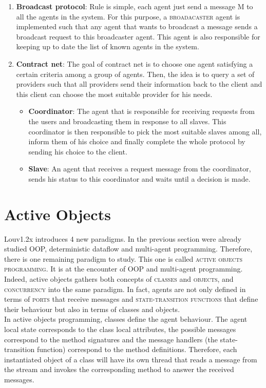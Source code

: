 \documentclass[11pt,a4paper,twoside,openright]{report}
\begin{document}
\begin{enumerate}
 \item \textbf{Broadcast protocol}: Rule is simple, each agent just send a 
message M to all the agents in the system. For this purpose, a 
\textsc{broadacaster} agent is implemented such that any agent that wants to 
broadcast a message sends a broadcast request to this broadcaster agent. This 
agent is also responsible for keeping up to date the list of known agents in 
the 
system.
 \item \textbf{Contract net}: The goal of contract net is to choose one agent 
satisfying a certain criteria among a group of agents. Then, the idea is to 
query a set of providers such that all providers send their information back to 
the client and this client can choose the most suitable provider for his needs.
  \begin{itemize}
    \item \textbf{Coordinator}: The agent that is responsible for receiving 
requests from the users and broadcasting them in response to all slaves. This 
coordinator is then responsible to pick the most suitable slaves among all, 
inform them of his choice and finally complete the whole protocol by sending 
his 
choice to the client.
    \item \textbf{Slave}: An agent that receives a request message from the 
coordinator, sends his status to this coordinator and waits until a decision is 
made.
 \end{itemize}
\end{enumerate}

\section{Active Objects}
Louv1.2x introduces 4 new paradigms. In the previous section were already 
studied OOP, deterministic dataflow and multi-agent programming. Therefore, 
there is one remaining paradigm to study. This one is called \textsc{active 
objects programming}. It is at the encounter of OOP and multi-agent 
programming. 
Indeed, active objects gathers both concepts of \textsc{classes} and 
\textsc{objects}, and \textsc{concurrency} into the same paradigm. In fact, 
agents are not only defined in terms of \textsc{ports} that receive messages 
and 
\textsc{state-transition functions} that define their behaviour but also in 
terms 
of classes and objects.\\

In active objects programming, classes define the agent behaviour. The agent 
local state corresponds to the class local attributes, the possible messages 
correspond to the method signatures and the message handlers (the 
state-transition function) correspond to the method definitions. Therefore, 
each 
instantiated object of a class will have its own thread that reads a message 
from the stream and invokes the corresponding method to answer the received 
messages.
\end{document}
